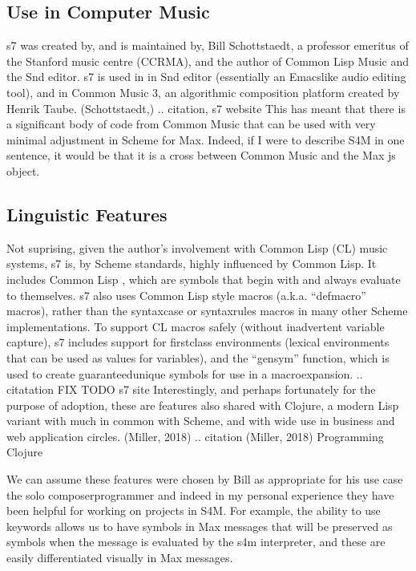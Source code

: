 \documentclass[letterpaper,10pt,english]{sphinxmanual}
\begin{document}
\subsection{Use in Computer Music}
\label{\detokenize{design:use-in-computer-music}}
\sphinxAtStartPar
s7 was created by, and is maintained by, Bill Schottstaedt, a professor emeritus of the Stanford music centre (CCRMA),
and the author of Common Lisp Music and the Snd editor.
s7 is used in in Snd editor (essentially an Emacs\sphinxhyphen{}like audio editing tool), and in Common Music 3, an algorithmic composition
platform created by Henrik Taube. (Schottstaedt,)
.. citation, s7 website
This has meant that there is a significant body of code from Common Music that can be used with very minimal adjustment in Scheme for Max.
Indeed, if I were to describe S4M in one sentence, it would be that it is a cross between Common Music and the Max js object.


\subsection{Linguistic Features}
\label{\detokenize{design:linguistic-features}}
\sphinxAtStartPar
Not suprising, given the author’s involvement with Common Lisp (CL) music systems, s7 is, by Scheme standards,
highly influenced by Common Lisp.
It includes Common Lisp , which are symbols that begin with and always evaluate to themselves.
s7 also uses Common Lisp style macros (a.k.a. “defmacro” macros), rather than the syntax\sphinxhyphen{}case or syntax\sphinxhyphen{}rules macros
in many other Scheme implementations.
To support CL macros safely (without inadvertent variable capture), s7 includes support for first\sphinxhyphen{}class environments
(lexical environments that can be used as values for variables), and the “gensym” function, which is used to create
guaranteed\sphinxhyphen{}unique symbols for use in a macroexpansion.
.. citatation FIX TODO s7 site
Interestingly, and perhaps fortunately for the purpose of adoption, these are features also shared with Clojure,
a modern Lisp variant with much in common with Scheme, and with wide use in business and web application circles.
(Miller, 2018)
.. citation (Miller, 2018) Programming Clojure

\sphinxAtStartPar
We can assume these features were chosen by Bill as appropriate for his use case \sphinxhyphen{} the solo composer\sphinxhyphen{}programmer \sphinxhyphen{}
and indeed in my personal experience they have been helpful for working on projects in S4M.
For example, the ability to use keywords allows us to have symbols in Max messages that will be preserved
as symbols when the message is evaluated by the s4m interpreter, and these are easily differentiated visually in Max messages.
\end{document}

